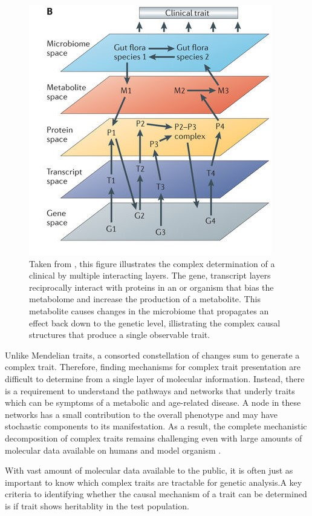 \documentclass[a4paper,11pt,twoside]{book}
\begin{document}
	\begin{figure}[htb]
		\centering
		\includegraphics[width=0.6\linewidth]{1.Introduction_Figures/nrg3575-f1.jpg}
		\caption{Taken from \citeauthor{Civelek2014SystemsTraits}, this figure illustrates the complex determination of a clinical by multiple interacting layers. The gene, transcript layers reciprocally interact with proteins in an or organism that bias the metabolome and increase the production of a metabolite. This metabolite causes changes in the microbiome that propagates an effect back down to the genetic level, illistrating the complex causal structures that produce a single observable trait.}
		\label{Multi-Layer Trait Determination}
	\end{figure}
	
    Unlike Mendelian traits, a consorted constellation of changes sum to generate a complex trait. Therefore, finding mechanisms for complex trait presentation are difficult to determine from a single layer of molecular information. Instead, there is a requirement to understand the pathways and networks that underly traits which can be symptoms of a metabolic and age-related disease. A node in these networks has a small contribution to the overall phenotype and may have stochastic components to its manifestation. As a result, the complete mechanistic decomposition of complex traits remains challenging even with large amounts of molecular data available on humans and model organism \citep{Civelek2014SystemsTraits}. 
	
	With vast amount of molecular data available to the public, it is often just as important to know which complex traits are tractable for genetic analysis.A key criteria to identifying whether the causal mechanism of a trait can be determined is if trait shows heritablity in the test population.
	
\end{document}
